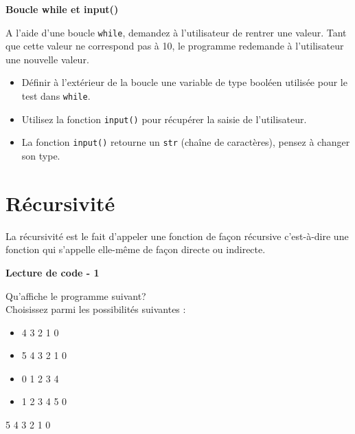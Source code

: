     
 \begin{Exercice}[10 minutes] \textbf{Boucle while et input()}
      	
      	A l'aide d'une boucle \lstinline{while}, demandez à l'utilisateur de rentrer une valeur. Tant que cette valeur ne correspond pas à 10, le programme redemande à l'utilisateur une nouvelle valeur.
    
        \begin{conseil}
           \begin{itemize}
           	\item Définir à l'extérieur de la boucle une variable de type booléen utilisée pour le test dans \lstinline{while}.
           	\item Utilisez la fonction \lstinline{input()} pour récupérer la saisie de l'utilisateur.
           	\item La fonction \lstinline{input()} retourne un \lstinline{str} (chaîne de caractères), pensez à changer son type.
           \end{itemize}
		     
        \end{conseil}
        
        \begin{solution}
            
        \end{solution}
    \end{Exercice}
    

     \section{Récursivité}
    
    La récursivité est le fait d'appeler une fonction de façon récursive c'est-à-dire une fonction qui s'appelle elle-même de façon directe ou indirecte. \\
    
	\begin{Exercice}[5 minutes] \textbf{Lecture de code - 1} 
	
	Qu'affiche le programme suivant? \\ 
	
	 
	
	Choisissez parmi les possibilités suivantes : \\
	
	\begin{itemize}
	\item 4  
	3 
	2 
	1 
	0 
	\item 5 
	4 
	3 
	2 
    1 
    0
	\item 0 
	1 
	2 
	3 
	4 
	\item 1 
	2 
	3 
	4
    5
    0
    \end{itemize}
    \begin{solution} 
			5  
			4  
			3  
			2  
			1  
			0  
		\end{solution} 
    
\end{Exercice}

